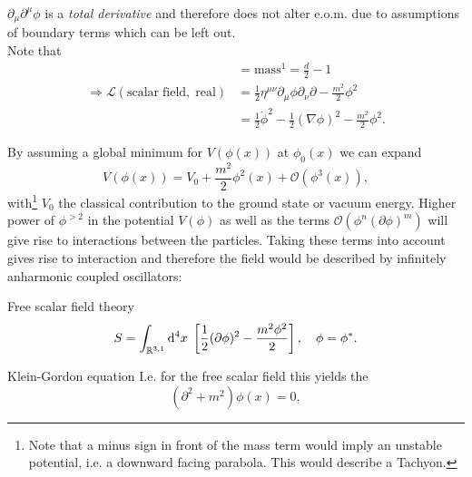 \begin{enumerate}
	$\partial_{\mu}\partial^{\mu}\phi$ is a \emph{total derivative} and therefore does not alter e.o.m. due to assumptions of boundary terms which can be left out.\\
	Note that
	\begin{align}
		[\phi] &= \mathrm{mass}^1 = \frac{d}{2} -1 \\
		 \Rightarrow \mathcal{L} (\mathrm{scalar \; field, \; real}) &= \frac{1}{2} \eta^{\mu \nu} \partial_{\mu} \phi \partial_{\nu} \partial - \frac{m^2}{2} \phi^2 \nonumber \\
		 &= \frac{1}{2} \dot{\phi}^2 - \frac{1}{2} (\nabla \phi)^2 - \frac{m^2}{2} \phi^2.
	\end{align}
\end{enumerate}
By assuming a global minimum for $V(\phi(x))$ at $\phi_0(x)$ we can expand 
\begin{equation}
	V(\phi(x)) = V_0 + \frac{m^2}{2} \phi^2(x) + \mathcal{O}(\phi^3(x)),
\end{equation}
with\footnote{Note that a minus sign in front of the mass term would imply an unstable potential, i.e. a downward facing parabola. This would describe a Tachyon.} $V_0$ the classical contribution to the ground state or vacuum energy. Higher power of $\phi^{>2}$ in the potential $V(\phi)$ as well as the terms $\mathcal{O}(\phi^n(\partial \phi)^m)$ will give rise to interactions between the particles. Taking these terms into account gives rise to interaction and therefore the field would be described by infinitely anharmonic coupled oscillators:
\begin{mybox}{Free scalar field theory}
	\begin{equation}
		S = \int_{\mathbb{R}^{3,1}} \mathrm{d}^4x \; \left[\frac{1}{2} (\partial \phi)^2 - \frac{m^2 \phi^2}{2}\right],\quad \phi=\phi^*.
	\end{equation}
\end{mybox}


\begin{mybox}{Klein-Gordon equation}
	I.e. for the free scalar field this yields the
	\begin{equation}	
	(\partial^2+m^2) \phi(x)=0,
	\end{equation}
\end{mybox}


